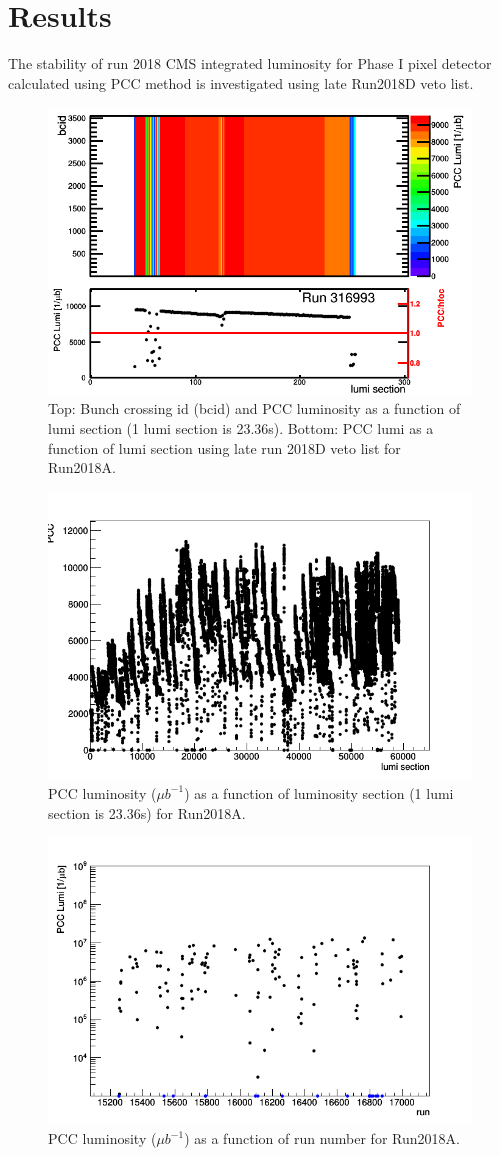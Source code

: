 \newpage \section{Results}
\label{sec:results}

The stability of run 2018 CMS integrated luminosity for Phase I pixel detector calculated using PCC method is investigated using late Run2018D veto list.

\begin{figure}[H]
  \centering
  \includegraphics[width=0.52\columnwidth]{./316993.png}
  \caption{Top: Bunch crossing id (bcid) and PCC luminosity as a function of lumi section (1 lumi section is 23.36s). Bottom: PCC lumi as a function of lumi section using late run 2018D veto list for Run2018A.}
  \label{fig:CMS}
\end{figure}


\begin{figure}[H]
  \centering
  \includegraphics[width=0.52\columnwidth]{./ls_lumi.png}
  \caption{PCC luminosity ($\mu b^{-1}$) as a function of luminosity section (1 lumi section is 23.36s) for Run2018A.}
  \label{fig:CMS}
\end{figure}


\begin{figure}[H]
  \centering
  \includegraphics[width=0.52\columnwidth]{./runs.png}
  \caption{PCC luminosity ($\mu b^{-1}$) as a function of run number for Run2018A.}
  \label{fig:CMS}
\end{figure}



